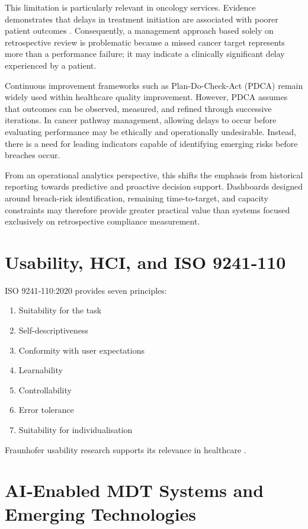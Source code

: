 This limitation is particularly relevant in oncology services. Evidence demonstrates that delays in treatment initiation are associated with poorer patient outcomes \citep{hanna2020, sharma2016}. Consequently, a management approach based solely on retrospective review is problematic because a missed cancer target represents more than a performance failure; it may indicate a clinically significant delay experienced by a patient. 

Continuous improvement frameworks such as Plan-Do-Check-Act (PDCA) remain widely used within healthcare quality improvement. However, PDCA assumes that outcomes can be observed, measured, and refined through successive iterations. In cancer pathway management, allowing delays to occur before evaluating performance may be ethically and operationally undesirable. Instead, there is a need for leading indicators capable of identifying emerging risks before breaches occur.

From an operational analytics perspective, this shifts the emphasis from historical reporting towards predictive and proactive decision support. Dashboards designed around breach-risk identification, remaining time-to-target, and capacity constraints may therefore provide greater practical value than systems focused exclusively on retrospective compliance measurement.

\section{Usability, HCI, and ISO 9241‑110}

ISO 9241‑110:2020 \citep{internationalorganizationforstandardization2020} provides seven principles:

\begin{enumerate}
    \item Suitability for the task
    \item Self-descriptiveness
    \item Conformity with user expectations
    \item Learnability
    \item Controllability
    \item Error tolerance
    \item Suitability for individualisation
\end{enumerate}

Fraunhofer usability research supports its relevance in healthcare \citep{hunkirchen}.

\section{AI‑Enabled MDT Systems and Emerging Technologies}

